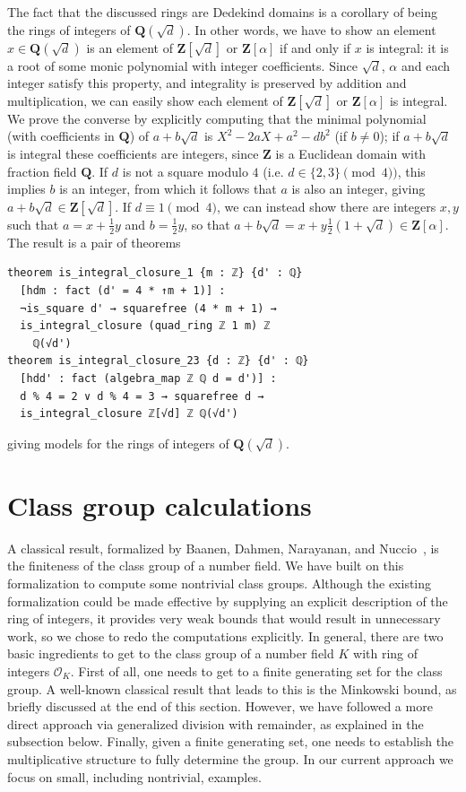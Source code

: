 \documentclass[sigplan,10pt,nonacm,
screen]{acmart} \settopmatter{printfolios=true,printccs=false,printacmref=false}
\newcommand{\QQ}{\mathbf{Q}}
\newcommand{\ZZ}{\mathbf{Z}}
\begin{document}
    The fact that the discussed rings are Dedekind domains is a corollary of being the rings of integers of $\QQ(\sqrt{d})$.
    In other words, we have to show an element $x \in \QQ(\sqrt{d})$ is an element of $\ZZ[\sqrt{d}]$ or $\ZZ[\alpha]$ if and only if $x$ is integral:
    it is a root of some monic polynomial with integer coefficients.
    Since $\sqrt{d}$, $\alpha$ and each integer satisfy this property, and integrality is preserved by addition and multiplication,
    we can easily show each element of $\ZZ[\sqrt{d}]$ or $\ZZ[\alpha]$ is integral.
    We prove the converse by explicitly computing that the minimal polynomial (with coefficients in $\QQ$) of $a + b \sqrt{d}$ is $X^2 - 2aX + a^2 - d b^2$ (if $b \ne 0$);
    if $a + b \sqrt{d}$ is integral these coefficients are integers, since $\ZZ$ is a Euclidean domain with fraction field $\QQ$.
    If $d$ is not a square modulo $4$ (i.e. $d \in \{2, 3\} \pmod 4)$, this implies $b$ is an integer, from which it follows that $a$ is also an integer, giving $a + b \sqrt{d} \in \ZZ[\sqrt{d}]$.
    If $d \equiv 1 \pmod 4$, we can instead show there are integers $x, y$ such that $a = x + \frac{1}{2}y$ and $b = \frac{1}{2}y$,
    so that $a + b \sqrt{d} = x + y\frac{1}{2}(1 + \sqrt{d}) \in \ZZ[\alpha]$.
    The result is a pair of theorems
\begin{lstlisting}
theorem is_integral_closure_1 {m : ℤ} {d' : ℚ}
  [hdm : fact (d' = 4 * ↑m + 1)] :
  ¬is_square d' → squarefree (4 * m + 1) →
  is_integral_closure (quad_ring ℤ 1 m) ℤ
    ℚ(√d')
theorem is_integral_closure_23 {d : ℤ} {d' : ℚ}
  [hdd' : fact (algebra_map ℤ ℚ d = d')] :
  d % 4 = 2 ∨ d % 4 = 3 → squarefree d →
  is_integral_closure ℤ[√d] ℤ ℚ(√d')
\end{lstlisting}
giving models for the rings of integers of $\QQ(\sqrt d)$.

\section{Class group calculations}\label{sec:class_group}

A classical result, formalized by Baanen, Dahmen, Narayanan, and Nuccio~\cite{baanen_formalization_2021}, is the finiteness of the class group of a number field.
We have built on this formalization to compute some nontrivial class groups.
Although the existing formalization could be made effective by supplying an explicit description of the ring of integers,
it provides very weak bounds that would result in unnecessary work,
so we chose to redo the computations explicitly.
In general, there are two basic ingredients to get to the class group of a number field $K$ with ring of integers $\mathcal{O}_K$. First of all, one needs to get to a finite generating set for the class group. A well-known
classical result that leads to this is the Minkowski bound, as briefly discussed at the end of this section.
However, we have followed a more direct approach via generalized division with remainder, as explained in the subsection below.
Finally, given a finite generating set, one needs to establish the multiplicative structure to fully determine the group. In our current approach we focus on small, including nontrivial, examples.
\end{document}
